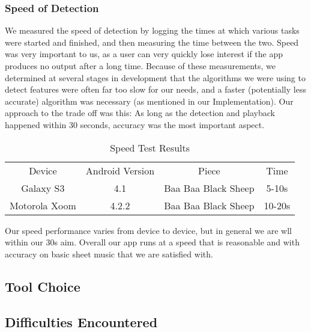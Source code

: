         \subsubsection{Speed of Detection}
        We measured the speed of detection by logging the times at which various tasks were started and finished, and then measuring the time between the two. Speed was very important to us, as a user can very quickly lose interest if the app produces no output after a long time. Because of these measurements, we determined at several stages in development that the algorithms we were using to detect features were often far too slow for our needs, and a faster (potentially less
        accurate) algorithm was necessary (as mentioned in our Implementation). Our approach to the trade off was this: As long as the detection and playback happened within 30 seconds, accuracy was the most important aspect. 
            \begin{table}[h!]
                \centering
                \begin{tabular}{ c | c | c | c }
                    Device & Android Version & Piece & Time \\
                    Galaxy S3 & 4.1 & Baa Baa Black Sheep & 5-10s \\
                    Motorola Xoom & 4.2.2 & Baa Baa Black Sheep & 10-20s
                \end{tabular}
                \caption{Speed Test Results}
                \label{table:speedtestresults}
            \end{table}
            Our speed performance varies from device to device, but in general we are wll within our 30s aim.
    Overall our app runs at a speed that is reasonable and with accuracy on basic sheet music that we are satisfied with.
    \subsection{Tool Choice}
    
        

    \subsection{Difficulties Encountered}

